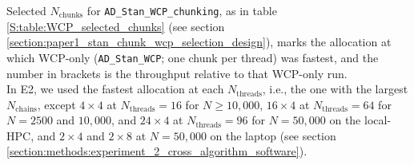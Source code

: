 \begin{table}[H]
{{%
        Selected $N_{\text{chunks}}$ for \texttt{AD\_Stan\_WCP\_chunking},
        as in table \ref{S:table:WCP_selected_chunks}
        (see section \ref{section:paper1_stan_chunk_wcp_selection_design}),
        \dag{} marks the allocation at which WCP-only
        (\texttt{AD\_Stan\_WCP}; one chunk per thread) was fastest,
        and the number in brackets is the throughput relative to that WCP-only run. \\
        In E2, we used the fastest allocation at each $N_{\text{threads}}$,
        i.e., the one with the largest $N_{\text{chains}}$,
        except $4 \times 4$ at $N_{\text{threads}} = 16$ for $N \ge 10,000$,
        $16 \times 4$ at $N_{\text{threads}} = 64$ for $N = 2500$ and $10,000$,
        and $24 \times 4$ at $N_{\text{threads}} = 96$ for $N = 50,000$ on the local-HPC,
        and $2 \times 4$ and $2 \times 8$ at $N{=}50,000$ on the laptop
        (see section \ref{section:methods:experiment_2_cross_algorithm_software}).
}}
\label{S:table:WCP_selected_chunks_Stan}
\end{table}
